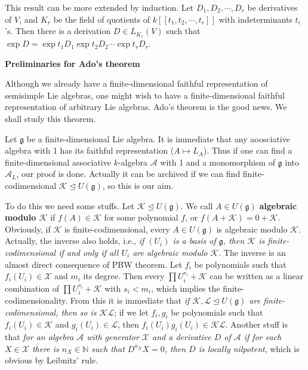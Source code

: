 \documentclass{article}
\newcommand{\NaN}{\mathbb{N}}
\newcommand{\lie}[1]{\mathfrak{#1}}
\begin{document}
This result can be more extended by induction.
Let $D_1, D_2, \cdots, D_r$ be derivatives of $V$, and $K_r$ be the field of quotients of $k[[t_1, t_2, \cdots, t_r]]$ with indeterminants $t_i$'s.
Then there is a derivation $D \in L_{K_r}(V)$ such that $\exp{D} = \exp{t_1 D_1} \exp{t_2 D_2} \cdots \exp{t_r D_r}$.

\newpage

\textbf{Preliminaries for Ado's theorem}

Although we already have a finite-dimensional faithful representation of semisimple Lie algebras, one might wish to have a finite-dimensional faithful representation of arbitrary Lie algebras.
Ado's theorem is the good news.
We shall study this theorem.

Let $\lie{g}$ be a finite-dimensional Lie algebra.
It is immediate that any aoosciative algebra with 1 has its faithful representation ($A \mapsto L_A$).
Thus if one can find a finite-dimensional associative $k$-algebra $\mathcal{A}$ with 1 and a monomorphism of $\lie{g}$ into $\mathcal{A}_L$, our proof is done.
Actually it can be archived if we can find finite-codimensional $\mathcal{K} \trianglelefteq U(\lie{g})$, so this is our aim.

To do this we need some stuffs.
Let $\mathcal{K} \trianglelefteq U(\lie{g})$.
We call $A \in U(\lie{g})$ \textbf{algebraic modulo $\mathcal{K}$} if $f(A) \in \mathcal{K}$ for some polynomial $f$, or $f(A + \mathcal{K}) = 0 + \mathcal{K}$.
Obviously, if $\mathcal{K}$ is finite-codimensional, every $A \in U(\lie{g})$ is algebraic modulo $\mathcal{K}$.
Actually, the inverse also holds, i.e., \textit{if $(U_i)$ is a basis of $\lie{g}$, then $\mathcal{K}$ is finite-codimensional if and only if all $U_i$ are algebraic modulo $\mathcal{K}$}.
The inverse is an almost direct consequence of PBW theorem.
Let $f_i$ be polynomials such that $f_i(U_i) \in \mathcal{X}$ and $m_i$ its degree.
Then every $\prod U_i^{r_i} + \mathcal{K}$ can be written as a linear combination of $\prod U_i^{s_i} + \mathcal{K}$ with $s_i < m_i$, which implies the finite-codimensionality.
From this it is immediate that \textit{if $\mathcal{K}, \mathcal{L} \trianglelefteq U(\lie{g})$ are finite-codimensional, then so is $\mathcal{K} \mathcal{L}$}; if we let $f_i, g_i$ be polynomials such that $f_i(U_i) \in \mathcal{K}$ and $g_i(U_i) \in \mathcal{L}$, then $f_i(U_i) g_i(U_i) \in \mathcal{K} \mathcal{L}$.
Another stuff is that \textit{for an algebra $\mathcal{A}$ with generator $\mathcal{X}$ and a derivative $D$ of $\mathcal{A}$ if for each $X \in \mathcal{X}$ there is $n_X \in \NaN$ such that $D^{n_X} X = 0$, then $D$ is locally nilpotent}, which is obvious by Leibnitz' rule.
\end{document}
